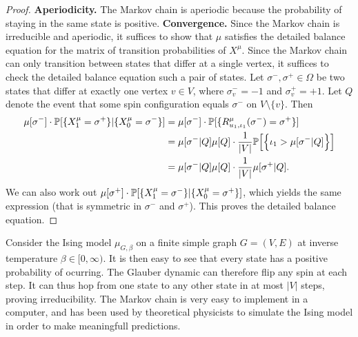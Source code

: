 \begin{proof}
    \textbf{Aperiodicity.}
    The Markov chain is aperiodic because the probability of staying in the same state is positive.
    \textbf{Convergence.}
    Since the Markov chain is irreducible and aperiodic,
    it suffices to show that $\mu$ satisfies the detailed balance equation
    for the matrix of transition probabilities of $X^\mu$.
    Since the Markov chain can only transition between states that differ at a single vertex,
    it suffices to check the detailed balance equation such a pair of states.
    Let $\sigma^-,\sigma^+\in\Omega$ be two states that differ at exactly one vertex $v\in V$,
    where $\sigma^-_v=-1$ and $\sigma^+_v=+1$.
    Let $Q$ denote the event that some spin configuration equals $\sigma^-$ on $V\setminus\{v\}$.
    Then
    \begin{align}
        \mu[\sigma^-]
        \cdot
        \P[\{X^\mu_{1}=\sigma^+\}|\{X^\mu_0=\sigma^-\}]
        &=\mu[\sigma^-]\cdot\P[\{R_{u_1,\iota_1}^\mu(\sigma^-)=\sigma^+\}]
        \\&=
        \mu[\sigma^-|Q]\mu[Q]\cdot\frac1{|V|}
        \P\Big[\Big\{\iota_1 > \mu[\sigma^-|Q]\Big\}\Big]
        \\&=
        \mu[\sigma^-|Q]\mu[Q]\cdot\frac1{|V|}\mu[\sigma^+|Q].
    \end{align}
    We can also work out $\mu[\sigma^+]\cdot\P[\{X^\mu_{1}=\sigma^-\}|\{X^\mu_0=\sigma^+\}]$,
    which yields the same expression (that is symmetric in $\sigma^-$ and $\sigma^+$).
    This proves the detailed balance equation.
\end{proof}

\begin{remark}
    Consider the Ising model $\mu_{G,\beta}$ on a finite simple graph $G=(V,E)$ at
    inverse temperature $\beta\in[0,\infty)$.
    It is then easy to see that every state has a positive probability of ocurring.
    The Glauber dynamic can therefore flip any spin at each step.
    It can thus hop from one state to any other state in at most $|V|$
    steps, proving irreducibility.
    The Markov chain is very easy to implement in a computer,
    and has been used by theoretical physicists to simulate the Ising model
    in order to make meaningfull predictions.
\end{remark}

